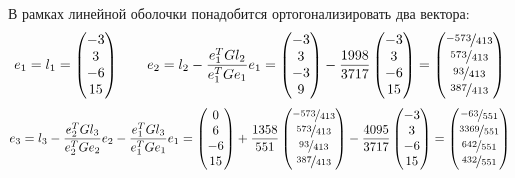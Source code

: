 \documentclass{article}
\begin{document}
\begin{center}
    В рамках линейной оболочки понадобится ортогонализировать два вектора:
    $$e_1 = l_1 = \begin{pmatrix}
            -3 \\ 3 \\ -6 \\ 15
        \end{pmatrix}\qquad
        e_2 = l_2 - \frac{e_1^{T}Gl_2}{e_1^TGe_1}e_1 = \begin{pmatrix}
            -3 \\ 3 \\ -3 \\ 9
        \end{pmatrix} - \frac{1998}{3717}\begin{pmatrix}
            -3 \\ 3 \\ -6 \\ 15
        \end{pmatrix} = \begin{pmatrix}
            \nicefrac{-573}{413} \\ \nicefrac{573}{413} \\ \nicefrac{93}{413} \\ \nicefrac{387}{413}
        \end{pmatrix}$$
    $$e_3 = l_3 - \frac{e_2^{T}Gl_3}{e_2^TGe_2}e_2 - \frac{e_1^{T}Gl_3}{e_1^TGe_1}e_1 = \begin{pmatrix}
            0 \\ 6 \\ -6 \\ 15
        \end{pmatrix} + \frac{1358}{551}\begin{pmatrix}
            \nicefrac{-573}{413} \\ \nicefrac{573}{413} \\ \nicefrac{93}{413} \\ \nicefrac{387}{413}
        \end{pmatrix} - \frac{4095}{3717}\begin{pmatrix}
            -3 \\ 3 \\ -6 \\ 15
        \end{pmatrix} = \begin{pmatrix}
            \nicefrac{-63}{551} \\ \nicefrac{3369}{551} \\ \nicefrac{642}{551} \\ \nicefrac{432}{551}

\end{pmatrix}$$
\end{center}
\end{document}
